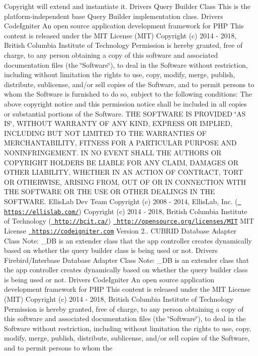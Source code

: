 \begin{DoxyCopyright}{Copyright}
will extend and instantiate it.  Drivers Query Builder Class This is the platform-\/independent base Query Builder implementation class.  Drivers Code\+Igniter An open source application development framework for P\+HP This content is released under the M\+IT License (M\+IT) Copyright (c) 2014 -\/ 2018, British Columbia Institute of Technology Permission is hereby granted, free of charge, to any person obtaining a copy of this software and associated documentation files (the \char`\"{}\+Software\char`\"{}), to deal in the Software without restriction, including without limitation the rights to use, copy, modify, merge, publish, distribute, sublicense, and/or sell copies of the Software, and to permit persons to whom the Software is furnished to do so, subject to the following conditions\+: The above copyright notice and this permission notice shall be included in all copies or substantial portions of the Software. T\+HE S\+O\+F\+T\+W\+A\+RE IS P\+R\+O\+V\+I\+D\+ED \char`\"{}\+A\+S I\+S\char`\"{}, W\+I\+T\+H\+O\+UT W\+A\+R\+R\+A\+N\+TY OF A\+NY K\+I\+ND, E\+X\+P\+R\+E\+SS OR I\+M\+P\+L\+I\+ED, I\+N\+C\+L\+U\+D\+I\+NG B\+UT N\+OT L\+I\+M\+I\+T\+ED TO T\+HE W\+A\+R\+R\+A\+N\+T\+I\+ES OF M\+E\+R\+C\+H\+A\+N\+T\+A\+B\+I\+L\+I\+TY, F\+I\+T\+N\+E\+SS F\+OR A P\+A\+R\+T\+I\+C\+U\+L\+AR P\+U\+R\+P\+O\+SE A\+ND N\+O\+N\+I\+N\+F\+R\+I\+N\+G\+E\+M\+E\+NT. IN NO E\+V\+E\+NT S\+H\+A\+LL T\+HE A\+U\+T\+H\+O\+RS OR C\+O\+P\+Y\+R\+I\+G\+HT H\+O\+L\+D\+E\+RS BE L\+I\+A\+B\+LE F\+OR A\+NY C\+L\+A\+IM, D\+A\+M\+A\+G\+ES OR O\+T\+H\+ER L\+I\+A\+B\+I\+L\+I\+TY, W\+H\+E\+T\+H\+ER IN AN A\+C\+T\+I\+ON OF C\+O\+N\+T\+R\+A\+CT, T\+O\+RT OR O\+T\+H\+E\+R\+W\+I\+SE, A\+R\+I\+S\+I\+NG F\+R\+OM, O\+UT OF OR IN C\+O\+N\+N\+E\+C\+T\+I\+ON W\+I\+TH T\+HE S\+O\+F\+T\+W\+A\+RE OR T\+HE U\+SE OR O\+T\+H\+ER D\+E\+A\+L\+I\+N\+GS IN T\+HE S\+O\+F\+T\+W\+A\+RE.  Ellis\+Lab Dev Team  Copyright (c) 2008 -\/ 2014, Ellis\+Lab, Inc. (\href{https://ellislab.com/}{\texttt{ https\+://ellislab.\+com/}})  Copyright (c) 2014 -\/ 2018, British Columbia Institute of Technology (\href{http://bcit.ca/}{\texttt{ http\+://bcit.\+ca/}})  \href{http://opensource.org/licenses/MIT}{\texttt{ http\+://opensource.\+org/licenses/\+M\+IT}} M\+IT License  \href{https://codeigniter.com}{\texttt{ https\+://codeigniter.\+com}}  Version 2..  C\+U\+B\+R\+ID Database Adapter Class Note\+: \+\_\+\+DB is an extender class that the app controller creates dynamically based on whether the query builder class is being used or not.  Drivers Firebird/\+Interbase Database Adapter Class Note\+: \+\_\+\+DB is an extender class that the app controller creates dynamically based on whether the query builder class is being used or not.  Drivers Code\+Igniter An open source application development framework for P\+HP This content is released under the M\+IT License (M\+IT) Copyright (c) 2014 -\/ 2018, British Columbia Institute of Technology Permission is hereby granted, free of charge, to any person obtaining a copy of this software and associated documentation files (the \char`\"{}\+Software\char`\"{}), to deal in the Software without restriction, including without limitation the rights to use, copy, modify, merge, publish, distribute, sublicense, and/or sell copies of the Software, and to permit persons to whom the 
\end{DoxyCopyright}

